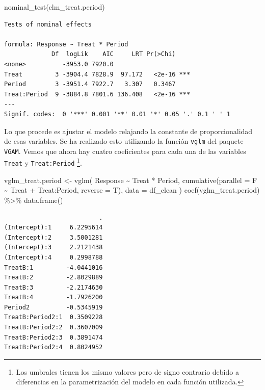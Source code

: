 \documentclass[
  12pt,
  a4paper,
  extrafontsizes,
  onecolumn,
  openright]{memoir}
\newenvironment{Shaded}{\begin{snugshade}}{\end{snugshade}}
\newcommand{\AttributeTok}[1]{\textcolor[rgb]{0.40,0.45,0.13}{#1}}
\newcommand{\FunctionTok}[1]{\textcolor[rgb]{0.28,0.35,0.67}{#1}}
\newcommand{\NormalTok}[1]{\textcolor[rgb]{0.00,0.23,0.31}{#1}}
\newcommand{\OtherTok}[1]{\textcolor[rgb]{0.00,0.23,0.31}{#1}}
\newcommand{\SpecialCharTok}[1]{\textcolor[rgb]{0.37,0.37,0.37}{#1}}
\begin{document}
\scriptsize

\begin{Shaded}
\begin{Highlighting}[]
\FunctionTok{nominal\_test}\NormalTok{(clm\_treat.period)}
\end{Highlighting}
\end{Shaded}

\begin{verbatim}
Tests of nominal effects

formula: Response ~ Treat * Period
             Df  logLik    AIC     LRT Pr(>Chi)    
<none>          -3953.0 7920.0                     
Treat         3 -3904.4 7828.9  97.172   <2e-16 ***
Period        3 -3951.4 7922.7   3.307   0.3467    
Treat:Period  9 -3884.8 7801.6 136.408   <2e-16 ***
---
Signif. codes:  0 '***' 0.001 '**' 0.01 '*' 0.05 '.' 0.1 ' ' 1
\end{verbatim}

\normalsize

Lo que procede es ajustar el modelo relajando la constante de
proporcionalidad de esas variables. Se ha realizado esto utilizando la
función \texttt{vglm} del paquete \texttt{VGAM}. Vemos que ahora hay
cuatro coeficientes para cada una de las variables \texttt{Treat} y
\texttt{Treat:Period} \footnote{Los umbrales tienen los mismo valores
  pero de signo contrario debido a diferencias en la parametrización del
  modelo en cada función utilizada.}.

\scriptsize

\begin{Shaded}
\begin{Highlighting}[]
\NormalTok{vglm\_treat.period }\OtherTok{\textless{}{-}} \FunctionTok{vglm}\NormalTok{(}
\NormalTok{    Response }\SpecialCharTok{\textasciitilde{}}\NormalTok{ Treat }\SpecialCharTok{*}\NormalTok{ Period,}
    \FunctionTok{cumulative}\NormalTok{(}\AttributeTok{parallel =}\NormalTok{ F }\SpecialCharTok{\textasciitilde{}}\NormalTok{ Treat }\SpecialCharTok{+}\NormalTok{ Treat}\SpecialCharTok{:}\NormalTok{Period, }\AttributeTok{reverse =}\NormalTok{ T),}
    \AttributeTok{data =}\NormalTok{ df\_clean}
\NormalTok{)}
\FunctionTok{coef}\NormalTok{(vglm\_treat.period) }\SpecialCharTok{\%\textgreater{}\%} \FunctionTok{data.frame}\NormalTok{()}
\end{Highlighting}
\end{Shaded}

\begin{verbatim}
                          .
(Intercept):1     6.2295614
(Intercept):2     3.5001281
(Intercept):3     2.2121438
(Intercept):4     0.2998788
TreatB:1         -4.0441016
TreatB:2         -2.8029889
TreatB:3         -2.2174630
TreatB:4         -1.7926200
Period2          -0.5345919
TreatB:Period2:1  0.3509228
TreatB:Period2:2  0.3607009
TreatB:Period2:3  0.3891474
TreatB:Period2:4  0.8024952
\end{verbatim}
\end{document}
